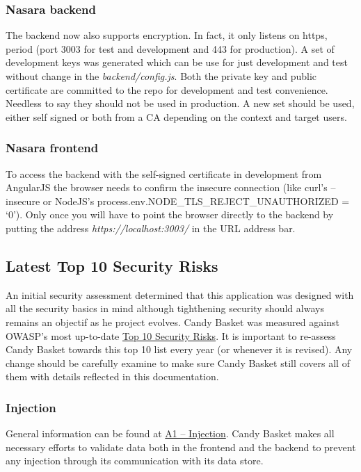 \documentclass[letterpaper,10pt,english]{sphinxmanual}
\begin{document}
\subsubsection{Nasara backend}
\label{developer-guide:nasara-backend}
The backend now also supports encryption. In fact, it only listens on
https, period (port 3003 for test and development and 443 for
production). A set of development keys was generated which can be use
for just development and test without change in the
\emph{backend/config.js}. Both the private key and public certificate are
committed to the repo for development and test convenience. Needless
to say they should not be used in production. A new set should be
used, either self signed or both from a CA depending on the context
and target users.


\subsubsection{Nasara frontend}
\label{developer-guide:nasara-frontend}
To access the backend with the self-signed certificate in development
from AngularJS the browser needs to confirm the insecure connection
(like curl's --insecure or NodeJS's
process.env.NODE\_TLS\_REJECT\_UNAUTHORIZED = `0'). Only once you will
have to point the browser directly to the backend by putting the
address \emph{https://localhost:3003/} in the URL address bar.


\subsection{Latest Top 10 Security Risks}
\label{developer-guide:latest-top-10-security-risks}
An initial security assessment determined that this application was
designed with all the security basics in mind although tighthening
security should always remains an objectif as he project
evolves. Candy Basket was measured against OWASP's most up-to-date
\href{https://owasp.org/index.php/Top\_10\_2013-Table\_of\_Contents}{Top 10 Security Risks}. It is
important to re-assess Candy Basket towards this top 10 list every
year (or whenever it is revised). Any change should be carefully
examine to make sure Candy Basket still covers all of them
with details reflected in this documentation.


\subsubsection{Injection}
\label{developer-guide:injection}
General information can be found at \href{https://owasp.org/index.php/Top\_10\_2013-A1-Injection}{A1 -- Injection}. Candy Basket
makes all necessary efforts to validate data both in the frontend and
the backend to prevent any injection through its communication with
its data store.
\end{document}
